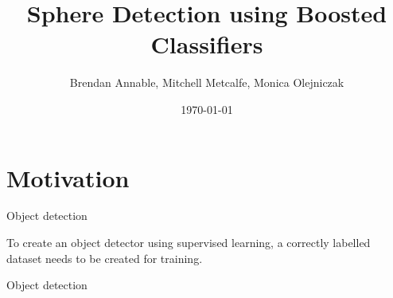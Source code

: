 \documentclass{beamer}
\title{Sphere Detection using Boosted Classifiers}
\author{Brendan Annable, Mitchell Metcalfe, Monica Olejniczak}
\institute{The University of Newcastle, Australia}
\date{\today}
\begin{document}
	\maketitle

	\section{Motivation}
	
	\begin{frame}{Object detection}
		\begin{center}
			
			To create an object detector using supervised learning, a correctly
			labelled dataset needs to be created for training.

			\citet{opencv_library}

		\end{center}
	\end{frame}

	\begin{frame}{Object detection}
		
    	
	\end{frame}
\end{document}
